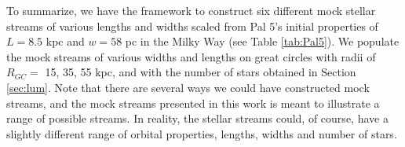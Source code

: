 \documentclass[twocolumn]{aastex62}
\newcommand{\todo}[1]{{\color{red} TODO: #1}}
\begin{document}
To summarize, we have the framework to construct six different mock stellar streams of various lengths and widths scaled from Pal 5's initial properties of $L = 8.5$ kpc and $w = 58$ pc in the Milky Way (see Table \ref{tab:Pal5}). We populate the mock streams of various widths and lengths on great circles with radii of $R_{GC} =$ 15, 35, 55 kpc, and with the number of stars obtained in Section \ref{sec:lum}. Note that there are several ways we could have constructed mock streams, and the mock streams presented in this work is meant to illustrate a range of possible streams. In reality, the stellar streams could, of course, have a slightly different range of orbital properties, lengths, widths and number of stars.




%
\end{document}
